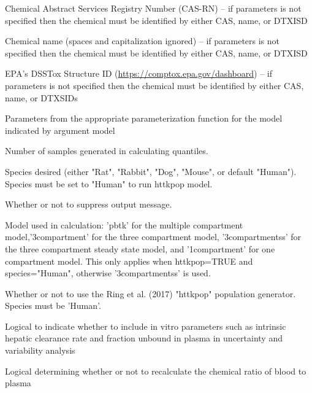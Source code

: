 \documentclass[a4paper]{book}
\begin{document}
%
\begin{Arguments}
\begin{ldescription}
\item[\code{chem.cas}] Chemical Abstract Services Registry Number (CAS-RN) -- if
parameters is not specified then the chemical must be identified by either
CAS, name, or DTXISD

\item[\code{chem.name}] Chemical name (spaces and capitalization ignored) --  if
parameters is not specified then the chemical must be identified by either
CAS, name, or DTXISD

\item[\code{dtxsid}] EPA's DSSTox Structure ID (\url{https://comptox.epa.gov/dashboard})
-- if parameters is not specified then the chemical must be identified by 
either CAS, name, or DTXSIDs

\item[\code{parameters}] Parameters from the appropriate parameterization function
for the model indicated by argument model

\item[\code{samples}] Number of samples generated in calculating quantiles.

\item[\code{species}] Species desired (either "Rat", "Rabbit", "Dog", "Mouse", or
default "Human"). Species must be set to "Human" to run httkpop model.

\item[\code{suppress.messages}] Whether or not to suppress output message.

\item[\code{model}] Model used in calculation: 'pbtk' for the multiple compartment
model,'3compartment' for the three compartment model, '3compartmentss' for
the three compartment steady state model, and '1compartment' for one
compartment model.  This only applies when httkpop=TRUE and species="Human",
otherwise '3compartmentss' is used.

\item[\code{httkpop}] Whether or not to use the Ring et al. (2017) "httkpop"
population generator. Species must be 'Human'.

\item[\code{invitrouv}] Logical to indicate whether to include in vitro parameters
such as intrinsic hepatic clearance rate and fraction unbound in plasma
in uncertainty and variability analysis

\item[\code{calcrb2p}] Logical determining whether or not to recalculate the 
chemical ratio of blood to plasma


\end{ldescription}
\end{Arguments}
\end{document}
